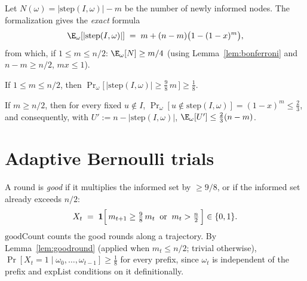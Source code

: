 \begin{lemma}\label{lem:expgrowth}
  \leanok
  Let $N(\omega) = |\mathrm{step}(I,\omega)| - m$ be the number of newly
  informed nodes. The formalization gives the \emph{exact} formula
  \[
    \E_\omega[|\mathrm{step}(I,\omega)|] \;=\;
      m + (n-m)\bigl(1-(1-x)^m\bigr),
  \]
  from which, if $1 \le m \le n/2$: $\E_\omega[N] \ge m/4$ (using
  Lemma~\ref{lem:bonferroni} and $n - m \ge n/2$, $mx \le 1$).
\end{lemma}

\begin{lemma}\label{lem:goodround}
  \leanok
  If $1 \le m \le n/2$, then
  $\Pr_\omega\bigl[\,|\mathrm{step}(I,\omega)| \ge \tfrac{9}{8}\,m\,\bigr]
    \ge \tfrac18$.
\end{lemma}

\begin{lemma}\label{lem:contract}
  \leanok
  If $m \ge n/2$, then for every fixed $u \notin I$,
  $\Pr_\omega[u \notin \mathrm{step}(I,\omega)] = (1-x)^m \le \tfrac23$, and
  consequently, with $U' := n - |\mathrm{step}(I,\omega)|$,
  $\E_\omega[U'] \le \tfrac23(n-m)$.
\end{lemma}

\section{Adaptive Bernoulli trials}\label{sec:adaptive}

\begin{definition}\label{def:good}
  \leanok
  A round is \emph{good} if it multiplies the informed set by $\ge 9/8$, or
  if the informed set already exceeds $n/2$:
  \[
    X_t \;=\; \mathbf{1}\Bigl[\, m_{t+1} \ge \tfrac98\, m_t
    \;\;\text{or}\;\; m_t > \tfrac n2 \,\Bigr] \in \{0,1\}.
  \]
  $\mathrm{goodCount}$ counts the good rounds along a trajectory. By
  Lemma~\ref{lem:goodround} (applied when $m_t \le n/2$; trivial otherwise),
  $\Pr[X_t = 1 \mid \omega_0,\dots,\omega_{t-1}] \ge \tfrac18$ for every
  prefix, since $\omega_t$ is independent of the prefix and
  $\mathrm{expList}$ conditions on it definitionally.
\end{definition}

